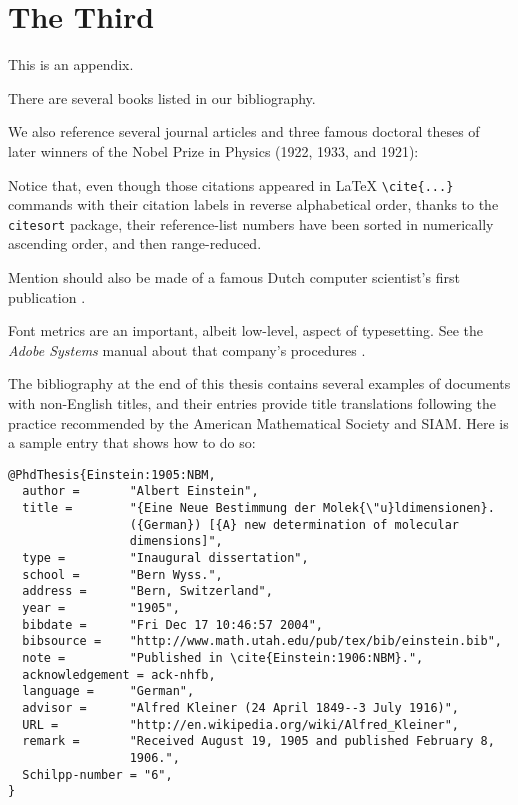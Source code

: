 
\chapter{The Third}

This is an appendix.

There are several books
\cite{%
    Singh:1997:FEE,%
    Salomon:1995:AT,%
    Robbins:2005:CSS,%
    Randell:1982:ODC,%
    Olver:2010:NHM,%
    Mittelbach:2004:LC,%
    Lamport:1985:LDP,%
    Knuth:1999:DT,%
    Knuth:1986:TB,%
    Knuth:1986:MB,%
    Farmelo:2009:SMH%
}
listed in our bibliography.

We also reference several journal articles
\cite{%
    Wiles:1995:MEC,%
    Taylor:1995:RTP,%
    Lahiri:2002:ADA,%
    Kim:1999:AFC,%
    Johnson:1978:LDT,%
    Huskey:1980:LLC,%
    Heilbron:1969:GBA,%
    Hall:1994:PNE,%
    Goldstine:1946:ENI,%
    Einstein:1911:BMAb,%
    Einstein:1911:BMAa,%
    Einstein:1906:NBM,%
    Cody:1981:APF,%
    Beebe:1989:PCP,%
    Babbage:1910:BBA%
}
and three famous doctoral theses of later winners
\cite{%
    Einstein:1905:NBM,%
    Dirac:1926:QM,%
    Bohr:1911:SME%
}
of the Nobel Prize in Physics (1922, 1933, and
1921):

Notice that, even though those citations appeared
in \LaTeX{} \verb=\cite{...}= commands with their
\BibTeX{} citation labels in reverse alphabetical
order, thanks to the \verb=citesort= package,
their reference-list numbers have been sorted in
numerically ascending order, and then
range-reduced.

Mention should also be made of a famous Dutch
computer scientist's first publication
\cite{Dijkstra:1953:FBV}.

Font metrics are an important, albeit low-level,
aspect of typesetting. See the \emph{Adobe
Systems} manual about that company's procedures
\cite{Adobe:1990:AFM}.

The bibliography at the end of this thesis contains several examples
of documents with non-English titles, and their \BibTeX{} entries
provide title translations following the practice recommended by the
American Mathematical Society and SIAM\@.  Here is a sample entry that
shows how to do so:
%
\begin{verbatim}
@PhdThesis{Einstein:1905:NBM,
  author =       "Albert Einstein",
  title =        "{Eine Neue Bestimmung der Molek{\"u}ldimensionen}.
                 ({German}) [{A} new determination of molecular
                 dimensions]",
  type =         "Inaugural dissertation",
  school =       "Bern Wyss.",
  address =      "Bern, Switzerland",
  year =         "1905",
  bibdate =      "Fri Dec 17 10:46:57 2004",
  bibsource =    "http://www.math.utah.edu/pub/tex/bib/einstein.bib",
  note =         "Published in \cite{Einstein:1906:NBM}.",
  acknowledgement = ack-nhfb,
  language =     "German",
  advisor =      "Alfred Kleiner (24 April 1849--3 July 1916)",
  URL =          "http://en.wikipedia.org/wiki/Alfred_Kleiner",
  remark =       "Received August 19, 1905 and published February 8,
                 1906.",
  Schilpp-number = "6",
}
\end{verbatim}

